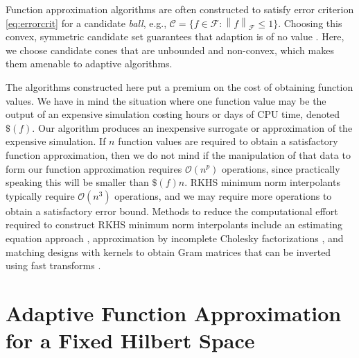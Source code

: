\documentclass[]{mcom-l}
\theoremstyle{remark}
\newcommand{\cc}{\mathcal{C}}
\newcommand{\calf}{{\mathcal{F}}}
\newcommand{\norm}[2][{}]{\ensuremath{\left \lVert #2 \right \rVert}_{#1}}
\newcommand{\Order}{\mathcal{O}}
\begin{document}
Function approximation algorithms are often constructed to satisfy error criterion \eqref{eq:errorcrit} for a candidate \emph{ball}, e.g., $\cc = \{f \in \calf : \norm[\calf]{f} \le 1\}$.  Choosing this convex, symmetric candidate set guarantees that adaption is of no value \cite{Bak71}.  Here, we choose candidate cones that are unbounded and non-convex, which makes them amenable to adaptive algorithms.

The algorithms constructed here put a premium on the cost of obtaining function values.  We have in mind the situation where one function value may be the output of an expensive simulation costing hours or days of CPU time, denoted $\$(f)$.  Our algorithm produces an inexpensive surrogate or approximation of the expensive simulation.  If $n$ function values are required to obtain a satisfactory function approximation, then we do not mind if the manipulation of that data to form our function approximation requires $\Order(n^p)$ operations, since practically speaking this will be smaller than $\$(f) n$.  RKHS minimum  norm interpolants typically require $\Order(n^3)$ operations, and we may require more operations to obtain a satisfactory error bound.  Methods to reduce the computational effort required to construct RKHS minimum norm interpolants include an estimating equation approach \cite{AniCheSte16a}, approximation by incomplete Cholesky factorizations \cite{OwhEtal19a}, and matching designs with kernels to obtain Gram matrices that can be inverted using fast transforms \cite{RatHic19a}.


\section{Adaptive Function Approximation for a Fixed Hilbert Space} \label{sec:fixedF}

\end{document}
